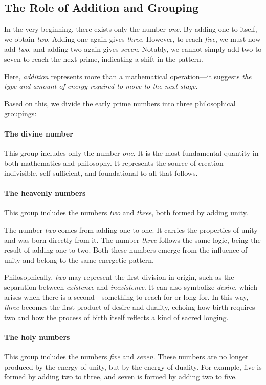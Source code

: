 \subsection{The Role of Addition and Grouping}

In the very beginning, there exists only the number \emph{one}. By adding one to itself, we obtain \emph{two}. Adding one again gives \emph{three}. However, to reach \emph{five}, we must now add \emph{two}, and adding two again gives \emph{seven}. Notably, we cannot simply add two to seven to reach the next prime, indicating a shift in the pattern.

Here, \emph{addition} represents more than a mathematical operation—it suggests \emph{the type and amount of energy required to move to the next stage}.

Based on this, we divide the early prime numbers into three philosophical groupings:

\paragraph{The divine number}  
This group includes only the number \emph{one}. It is the most fundamental quantity in both mathematics and philosophy. It represents the source of creation—indivisible, self-sufficient, and foundational to all that follows.

\paragraph{The heavenly numbers}  
This group includes the numbers \emph{two} and \emph{three}, both formed by adding unity.

The number \emph{two} comes from adding one to one. It carries the properties of unity and was born directly from it. The number \emph{three} follows the same logic, being the result of adding one to two. Both these numbers emerge from the influence of unity and belong to the same energetic pattern.

Philosophically, \emph{two} may represent the first division in origin, such as the separation between \emph{existence} and \emph{inexistence}. It can also symbolize \emph{desire}, which arises when there is a second—something to reach for or long for. In this way, \emph{three} becomes the first product of desire and duality, echoing how birth requires two and how the process of birth itself reflects a kind of sacred longing.

\paragraph{The holy numbers}  
This group includes the numbers \emph{five} and \emph{seven}. These numbers are no longer produced by the energy of unity, but by the energy of duality. For example, five is formed by adding two to three, and seven is formed by adding two to five.

